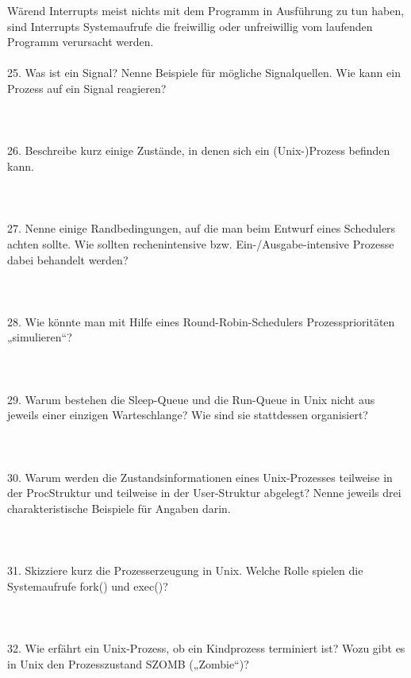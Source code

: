 \documentclass{article}
\begin{document}
W\"arend Interrupts meist nichts mit dem Programm in Ausf\"uhrung zu tun haben, sind Interrupts Systemaufrufe die freiwillig oder unfreiwillig vom laufenden Programm verursacht werden.
\\
\\
25. Was ist ein Signal? Nenne Beispiele für mögliche Signalquellen. Wie kann ein Prozess auf
ein Signal reagieren?
\\
\\
\\
\\
26. Beschreibe kurz einige Zustände, in denen sich ein (Unix-)Prozess befinden kann.
\\
\\
\\
\\
27. Nenne einige Randbedingungen, auf die man beim Entwurf eines Schedulers achten sollte.
Wie sollten rechenintensive bzw. Ein-/Ausgabe-intensive Prozesse dabei behandelt werden?
\\
\\
\\
\\
28. Wie könnte man mit Hilfe eines Round-Robin-Schedulers Prozessprioritäten „simulieren“?
\\
\\
\\
\\
29. Warum bestehen die Sleep-Queue und die Run-Queue in Unix nicht aus jeweils einer
einzigen Warteschlange? Wie sind sie stattdessen organisiert?
\\
\\
\\
\\
30. Warum werden die Zustandsinformationen eines Unix-Prozesses teilweise in der ProcStruktur und teilweise in der User-Struktur abgelegt? Nenne jeweils drei charakteristische
Beispiele für Angaben darin.
\\
\\
\\
\\
31. Skizziere kurz die Prozesserzeugung in Unix. Welche Rolle spielen die Systemaufrufe fork()
und exec()?
\\
\\
\\
\\
32. Wie erfährt ein Unix-Prozess, ob ein Kindprozess terminiert ist? Wozu gibt es in Unix den
Prozesszustand SZOMB („Zombie“)?
\\
\\
\end{document}
